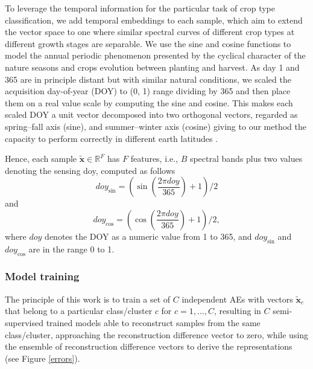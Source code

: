 \documentclass[journal,article,submit,pdftex,moreauthors]{Definitions/mdpi}
\begin{document}
To leverage the temporal information for the particular task of crop type classification, we add temporal embeddings to each sample, which aim to extend the vector space to one where similar spectral curves of different crop types at different growth stages are separable. 
We use the sine and cosine functions to model the annual periodic phenomenon presented by the cyclical character of the nature seasons and crops evolution between planting and harvest. As day 1 and 365 are in principle distant but with similar natural conditions, we scaled the acquisition day-of-year (\ac{DOY}) to (0, 1) range dividing by 365 and then place them on a real value scale by computing the sine and cosine. This makes each scaled \ac{DOY} a unit vector decomposed into two orthogonal vectors, regarded as spring–fall axis (sine), and summer–winter axis (cosine) giving to our method the capacity to perform correctly in different earth latitudes \cite{Dahlin2016}.

Hence, each sample $\mathbf{\tilde{x}} \in \mathbb{R}^F$
has $F$ features, i.e., $B$ spectral bands plus two values denoting the sensing doy, computed as follows
\begin{equation}
	doy_{\sin} = \left(\sin\left(\frac{2\pi doy}{365}\right)+1\right)/2
\end{equation}
and
\begin{equation}
	doy_{\cos} = \left(\cos\left(\frac{2\pi doy}{365}\right)+1\right)/2, 
\end{equation}
where $doy$ denotes the \ac{DOY} as a numeric value from 1 to 365, and $doy_{\sin}$ and $doy_{\cos}$ are in the range 0 to 1.

\subsubsection{Model training}
The principle of this work is to train a set of $C$ independent AEs with vectors $\mathbf{\tilde{x}}_c$ that belong to a particular class/cluster $c$ for $c=1,\dots,C$,  resulting in $C$ semi-supervised trained models able to reconstruct samples from the same class/cluster, approaching the reconstruction difference vector to zero, while using the ensemble of reconstruction difference vectors to derive the representations (see Figure \ref{errors}).
\end{document}
